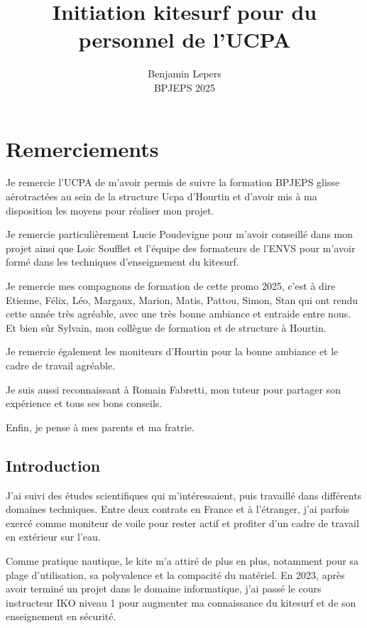 \documentclass[11pt,a4paper]{report}
\begin{document}
\author{Benjamin Lepers \\ BPJEPS 2025 }
\title{Initiation kitesurf pour du personnel de l'UCPA}
\maketitle
\chapter*{Remerciements}

Je remercie l'UCPA de m'avoir permis de suivre la formation
BPJEPS glisse aérotractées au sein de la structure Ucpa 
d'Hourtin et d'avoir mis à ma disposition les moyens pour
réaliser mon projet.
 
Je remercie particulièrement Lucie Poudevigne pour m'avoir
conseillé  dans mon projet ainsi que Loic Soufflet et l'équipe des
formateurs de l'ENVS pour m'avoir formé dans les techniques
d'enseignement du kitesurf.

Je remercie mes compagnons de formation de cette promo 2025,
c'est à dire Etienne, Félix, Léo, Margaux, Marion, Matis, Pattou,
Simon, Stan qui ont rendu cette année très agréable,
avec une très bonne ambiance et entraide entre nous.
Et bien s\^ur Sylvain, mon collègue de formation et 
de structure à Hourtin.

Je remercie également les moniteurs d'Hourtin  pour la
bonne ambiance et le cadre de travail agréable.

Je suis aussi reconnaissant à  Romain Fabretti, mon tuteur
pour partager son expérience et tous ses bons conseils.

Enfin, je pense à  mes parents et ma fratrie.

\tableofcontents
\newpage
\section{Introduction}
J'ai suivi des études scientifiques qui m'intéressaient, puis
travaillé dans différents domaines techniques. Entre deux contrats en 
France et à l'étranger, j'ai parfois exercé comme moniteur de voile
pour rester actif et profiter d'un cadre de travail en extérieur
sur l'eau.

Comme pratique nautique, le kite m'a attiré de plus en plus, 
notamment pour sa plage d'utilisation, sa polyvalence et la 
compacité du matériel. En 2023, après avoir terminé un projet
dans le domaine informatique, j'ai passé le cours instructeur
IKO\cite{iko} niveau 1 pour augmenter ma connaissance du kitesurf
et de son enseignement en sécurité.
\end{document}
